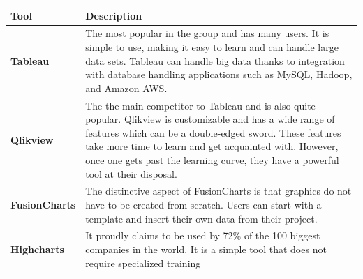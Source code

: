 \documentclass[]{book}
\theoremstyle{definition}
\theoremstyle{definition}
\theoremstyle{definition}
\theoremstyle{remark}
\begin{document}
\begin{longtable}[]{@{}ll@{}}
\toprule
\begin{minipage}[b]{0.16\columnwidth}\raggedright\strut
\textbf{Tool}\strut
\end{minipage} & \begin{minipage}[b]{0.78\columnwidth}\raggedright\strut
\textbf{Description}\strut
\end{minipage}\tabularnewline
\midrule
\endhead
\begin{minipage}[t]{0.16\columnwidth}\raggedright\strut
\textbf{Tableau}\strut
\end{minipage} & \begin{minipage}[t]{0.78\columnwidth}\raggedright\strut
The most popular in the group and has many users. It is simple to use,
making it easy to learn and can handle large data sets. Tableau can
handle big data thanks to integration with database handling
applications such as MySQL, Hadoop, and Amazon AWS.\strut
\end{minipage}\tabularnewline
\begin{minipage}[t]{0.16\columnwidth}\raggedright\strut
\textbf{Qlikview}\strut
\end{minipage} & \begin{minipage}[t]{0.78\columnwidth}\raggedright\strut
The the main competitor to Tableau and is also quite popular. Qlikview
is customizable and has a wide range of features which can be a
double-edged sword. These features take more time to learn and get
acquainted with. However, once one gets past the learning curve, they
have a powerful tool at their disposal.\strut
\end{minipage}\tabularnewline
\begin{minipage}[t]{0.16\columnwidth}\raggedright\strut
\textbf{FusionCharts}\strut
\end{minipage} & \begin{minipage}[t]{0.78\columnwidth}\raggedright\strut
The distinctive aspect of FusionCharts is that graphics do not have to
be created from scratch. Users can start with a template and insert
their own data from their project.\strut
\end{minipage}\tabularnewline
\begin{minipage}[t]{0.16\columnwidth}\raggedright\strut
\textbf{Highcharts}\strut
\end{minipage} & \begin{minipage}[t]{0.78\columnwidth}\raggedright\strut
It proudly claims to be used by 72\% of the 100 biggest companies in the
world. It is a simple tool that does not require specialized training

\end{minipage}
\end{longtable}
\end{document}
